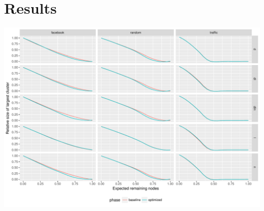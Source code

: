 \documentclass{beamer}
\begin{document}
\section{Results}
\begin{frame}

\includegraphics[width=\textwidth]{results.pdf}
  

  
\end{frame}
\end{document}

